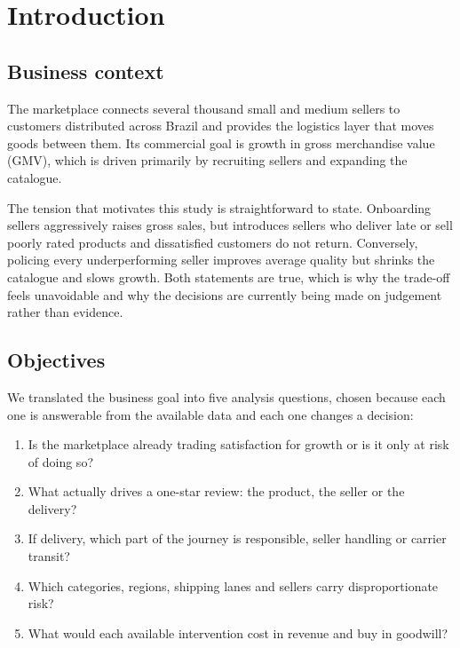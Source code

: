 \documentclass[11pt,a4paper]{article}
\begin{document}
\section{Introduction}

\subsection{Business context}

The marketplace connects several thousand small and medium sellers to customers
distributed across Brazil and provides the logistics layer that moves goods
between them. Its commercial goal is growth in gross merchandise value (GMV),
which is driven primarily by recruiting sellers and expanding the catalogue.

The tension that motivates this study is straightforward to state. Onboarding
sellers aggressively raises gross sales, but introduces sellers who deliver
late or sell poorly rated products and dissatisfied customers do not return.
Conversely, policing every underperforming seller improves average quality but
shrinks the catalogue and slows growth. Both statements are true, which is why the
trade-off feels unavoidable and why the decisions are currently being made on
judgement rather than evidence.

\subsection{Objectives}

We translated the business goal into five analysis questions, chosen because each
one is answerable from the available data and each one changes a decision:

\begin{enumerate}[leftmargin=*,itemsep=0.25em]
  \item Is the marketplace already trading satisfaction for growth or is it only at
        risk of doing so?
  \item What actually drives a one-star review: the product, the seller or the
        delivery?
  \item If delivery, which part of the journey is responsible, seller handling
        or carrier transit?
  \item Which categories, regions, shipping lanes and sellers carry
        disproportionate risk?
  \item What would each available intervention cost in revenue and buy in
        goodwill?
\end{enumerate}
\end{document}
